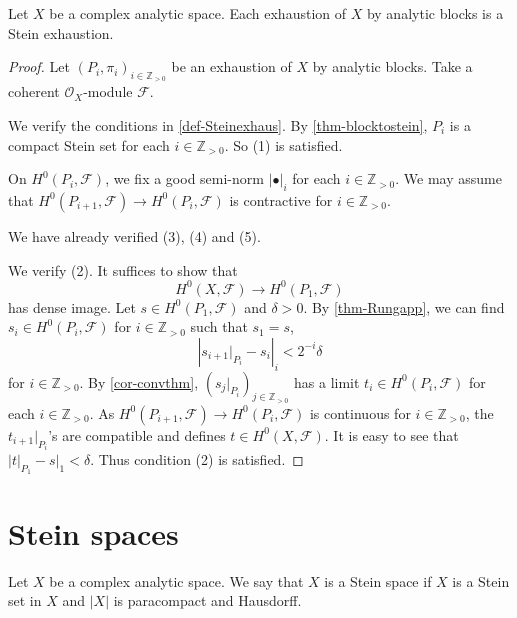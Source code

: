 \begin{thm}\label{thm-AllanalybloexhisStein}
    Let $X$ be a complex analytic space.
    Each exhaustion of $X$ by analytic blocks is a Stein exhaustion.
\end{thm}
\begin{proof}
    Let $(P_i,\pi_i)_{i\in \mathbb{Z}_{>0}}$ be an exhaustion of $X$ by analytic blocks. Take a coherent $\mathcal{O}_X$-module $\mathcal{F}$.

    We verify the conditions in \cref{def-Steinexhaus}.
    By \cref{thm-blocktostein}, $P_i$ is a compact Stein set for each $i\in \mathbb{Z}_{>0}$. So (1) is satisfied.
    
    On $H^0(P_i,\mathcal{F})$, we fix a good semi-norm $|\bullet|_i$ for each $i\in \mathbb{Z}_{>0}$. We may assume that $H^0(P_{i+1},\mathcal{F})\rightarrow H^0(P_i,\mathcal{F})$ is contractive for $i\in \mathbb{Z}_{>0}$.

    We have already verified (3), (4) and (5).

    We verify (2). It suffices to show that
    \[
        H^0(X,\mathcal{F})\rightarrow H^0(P_1,\mathcal{F})  
    \]
    has dense image. Let $s\in H^0(P_1,\mathcal{F})$ and $\delta>0$. By \cref{thm-Rungapp}, we can find $s_i\in H^0(P_i,\mathcal{F})$ for $i\in \mathbb{Z}_{>0}$ such that $s_1=s$, 
    \[
        \left| s_{i+1}|_{P_i}-s_i \right|_i<2^{-i}\delta
    \]
    for $i\in \mathbb{Z}_{>0}$. By \cref{cor-convthm}, $(s_j|_{P_i})_{j\in \mathbb{Z}_{>0}}$ has a limit $t_i\in H^0(P_i,\mathcal{F})$ for each $i\in \mathbb{Z}_{>0}$. As $H^0(P_{i+1},\mathcal{F})\rightarrow H^0(P_{i},\mathcal{F})$ is continuous for $i\in \mathbb{Z}_{>0}$, the $t_{i+1}|_{P_i}$'s are compatible and defines $t\in H^0(X,\mathcal{F})$. It is easy to see that $|t|_{P_1}-s|_1<\delta$. Thus condition (2) is satisfied.
\end{proof}


\section{Stein spaces}

\begin{definition}
    Let $X$ be a complex analytic space. We say that $X$ is a Stein space if $X$ is a Stein set in $X$ and $|X|$ is paracompact and Hausdorff.
\end{definition}

